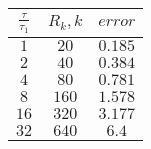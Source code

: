 \begin{tabular}{| c | c | c |}
\hline

$\frac{\tau}{\tau_1}$ & $R_k, k$ & $error$ \\
\hline
$1$ & $20$ & $0.185$\\
\hline
$2$ & $40$ & $0.384$\\
\hline
$4$ & $80$ & $0.781$\\
\hline
$8$ & $160$ & $1.578$\\
\hline
$16$ & $320$ & $3.177$\\
\hline
$32$ & $640$ & $6.4$\\
\hline
\end{tabular}
